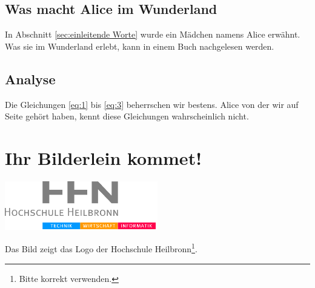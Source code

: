 \subsection{Was macht Alice im Wunderland}
\label{sec:was-macht-alice}
In Abschnitt \ref{sec:einleitende Worte} wurde ein Mädchen namens Alice erwähnt. Was sie im Wunderland erlebt, kann in einem Buch nachgelesen werden.

\subsection{Analyse}
\label{sec:analyse}
Die Gleichungen \eqref{eq:1} bis \eqref{eq:3} beherrschen wir bestens. Alice von der wir auf Seite \pageref{sec:einleitende Worte} gehört haben, kennt diese Gleichungen wahrscheinlich nicht. \cite{Ploder1995}

\section{Ihr Bilderlein kommet!}
\label{sec:ihr-bilderlein-kommet}
\begin{center}
	\includegraphics[width=0.5\textwidth]{01_introduction/pics/HHN}
\end{center}
\begin{center}
	Das Bild zeigt das Logo der Hochschule Heilbronn\footnote{Bitte korrekt verwenden.}.
\end{center}